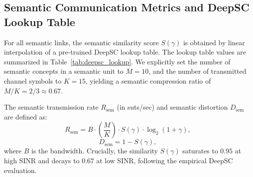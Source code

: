 \documentclass[journal,onecolumn]{IEEEtran}
\begin{document}
\subsection{Semantic Communication Metrics and DeepSC Lookup Table}
For all semantic links, the semantic similarity score $S(\gamma)$ is obtained by linear interpolation of a pre-trained DeepSC lookup table. The lookup table values are summarized in Table~\ref{tab:deepsc_lookup}.
We explicitly set the number of semantic concepts in a semantic unit to $M=10$, and the number of transmitted channel symbols to $K=15$, yielding a semantic compression ratio of $M/K = 2/3 \approx 0.67$.

The semantic transmission rate $R_{\text{sem}}$ (in suts/sec) and semantic distortion $D_{\text{sem}}$ are defined as:
\begin{equation}
    R_{\text{sem}} = B \cdot \left( \frac{M}{K} \right) \cdot S(\gamma) \cdot \log_2(1 + \gamma),
\end{equation}
\begin{equation}
    D_{\text{sem}} = 1 - S(\gamma),
\end{equation}
where $B$ is the bandwidth. Crucially, the similarity $S(\gamma)$ saturates to $0.95$ at high SINR and decays to $0.67$ at low SINR, following the empirical DeepSC evaluation.
\end{document}

